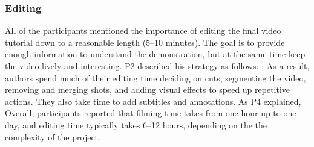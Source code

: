 \subsubsection{Editing}
All of the participants mentioned the importance of editing the final video tutorial down to a reasonable length (5--10 minutes). The goal is to provide enough information to understand the demonstration, but at the same time keep the video lively and interesting. P2 described his strategy as follows: ;  As a result, authors spend much of their editing time deciding on cuts, segmenting the video, removing and merging shots, and adding visual
effects to speed up repetitive actions. They also take time to add
subtitles and annotations. As P4 explained,  Overall, participants reported that filming time takes from one hour up to one day, and editing time typically takes 6--12 hours, depending on the the complexity of the project.

